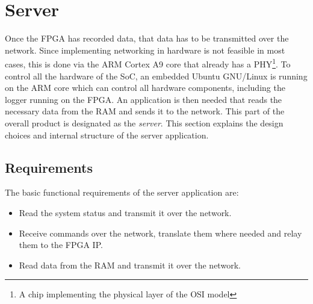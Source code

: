 %
%
\chapter{Server} %
\label{ch:server}
%
%

Once the  FPGA has  recorded data, that  data has to  be transmitted  over the
network. Since implementing  networking in  hardware is  not feasible  in most
cases,  this  is  done  via  the  ARM  Cortex  A9  core  that  already  has  a
PHY\footnote{
    A chip implementing the physical layer of the OSI model%
}.
To  control all  the hardware  of  the SoC,  an embedded  Ubuntu GNU/Linux  is
running on the  ARM core which can control all  hardware components, including
the logger running on the FPGA.  An  application is then needed that reads the
necessary data  from the  RAM and sends  it to the  network. This part  of the
overall product is designated as  the \emph{server}. This section explains the
design choices and internal structure of the server application.

\section{Requirements} %
\label{sec:server:requirements}

The basic functional requirements of the server application are:
\begin{itemize}\tightlist
    \item
        Read the system status and transmit it over the network.
    \item
        Receive commands  over the  network, translate  them where  needed and
        relay them to the FPGA IP.
    \item
        Read data from the RAM and transmit it over the network.
\end{itemize}

